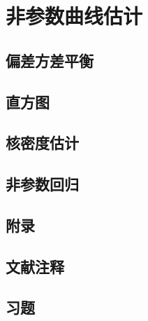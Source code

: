 \chapter{非参数曲线估计}

\section{偏差方差平衡}

\pending

\section{直方图}

\pending

\section{核密度估计}

\pending

\section{非参数回归}

\pending

\section{附录}

\pending

\section{文献注释}

\pending

\section{习题}

\pending

